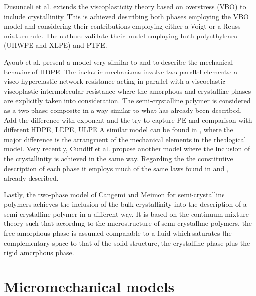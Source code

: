 Dusunceli et al. \citep{dusunceliModellingEffectsDegree2008} extends the viscoplasticity theory based on overstress (VBO) to include crystallinity.
This is achieved describing both phases employing the VBO model and considering their contributions employing either a Voigt or a Reuss mixture rule.
The authors validate their model employing both polyethylenes (UHWPE and XLPE) and PTFE.

Ayoub et al. \citep{ayoubModellingLargeDeformation2010, ayoubEffectsCrystalContent2011} present a model very similar to \cite{ahziModelingDeformationBehavior2003} and \cite{boyceConstitutiveModelFinite2000} to describe the mechanical behavior of HDPE.
The inelastic mechanisms involve two parallel elements: a visco-hyperelastic network resistance acting in parallel with a viscoelastic–viscoplastic intermolecular resistance where the amorphous and crystalline phases are explicitly taken into consideration.
The semi-crystalline polymer is considered as a two-phase composite in a way similar to what has already been described.
\colorbox{BrickRed}{Add the difference with exponent and the try to capture PE and comparison with different HDPE, LDPE, ULPE}
A similar model can be found in \citep{abdul-hameedTwophaseHyperelasticviscoplasticConstitutive2014}, where the major difference is the arrangment of the mechanical elements in the rheological model.
Very recently, Cundiff et al. \citep{cundiffModelingViscoplasticBehavior2022} propose another model where the inclusion of the crystallinity is achieved in the same way.
Regarding the the constitutive description of each phase it employs much of the same laws found in \cite{ahziModelingDeformationBehavior2003} and \cite{chowdhuryEffectsManufacturingInducedVoids2008}, already described.

Lastly, the two-phase model of Cangemi and Meimon for semi-crystalline polymers \citep{cangemiTwoPhaseModelMechanical2001} achieves the inclusion of the bulk crystallinity into the description of a semi-crystalline polymer in a different way.
It is based on the continuum mixture theory such that according to the microstructure of semi-crystalline polymers, the free amorphous phase is assumed comparable to a fluid which saturates the complementary space to that of the solid structure, the crystalline phase plus the rigid amorphous phase.

\section{Micromechanical models}

